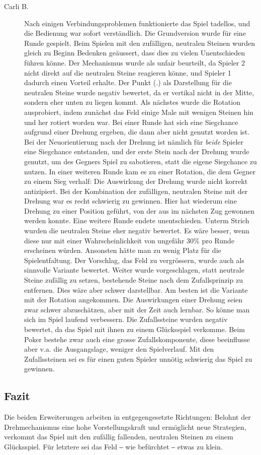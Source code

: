 \documentclass[a4paper,11pt,hidelinks]{scrartcl}
\begin{document}
\begin{description}
    \item[Carli B.] Nach einigen Verbindungsproblemen funktionierte das Spiel tadellos, und die Bedienung war sofort verständlich. Die Grundversion wurde für eine Runde gespielt. Beim Spielen mit den zufälligen, neutralen Steinen wurden gleich zu Beginn Bedenken geäussert, dass dies zu vielen Unentschieden führen könne. Der Mechanismus wurde als unfair beurteilt, da Spieler 2 nicht direkt auf die neutralen Steine reagieren könne, und Spieler 1 dadurch einen Vorteil erhalte. Der Punkt (.) als Darstellung für die neutralen Steine wurde negativ bewertet, da er vertikal nicht in der Mitte, sondern eher unten zu liegen kommt. Als nächstes wurde die Rotation ausprobiert, indem zunächst das Feld einige Male mit wenigen Steinen hin und her rotiert worden war. Bei einer Runde hat sich eine Siegchance aufgrund einer Drehung ergeben, die dann aber nicht genutzt worden ist. Bei der Neuorientierung nach der Drehung ist nämlich für \textit{beide} Spieler eine Siegchance entstanden, und der erste Stein nach der Drehung wurde genutzt, um des Gegners Spiel zu sabotieren, statt die eigene Siegchance zu nutzen. In einer weiteren Runde kam es zu einer Rotation, die dem Gegner zu einem Sieg verhalf: Die Auswirkung der Drehung wurde nicht korrekt antizipiert. Bei der Kombination der zufälligen, neutralen Steine mit der Drehung war es recht schwierig zu gewinnen. Hier hat wiederum eine Drehung zu einer Position geführt, von der aus im nächsten Zug gewonnen werden konnte. Eine weitere Runde endete unentschieden. Unterm Strich wurden die neutralen Steine eher negativ bewertet. Es wäre besser, wenn diese nur mit einer Wahrscheinlichkeit von ungefähr 30\% pro Runde erscheinen würden. Ansonsten hätte man zu wenig Platz für die Spielentfaltung. Der Vorschlag, das Feld zu vergrössern, wurde auch als sinnvolle Variante bewertet. Weiter wurde vorgeschlagen, statt neutrale Steine zufällig zu setzen, bestehende Steine nach dem Zufallsprinzip zu entfernen. Dies wäre aber schwer darstellbar. Am besten ist die Variante mit der Rotation angekommen. Die Auswirkungen einer Drehung seien zwar schwer abzuschätzen, aber mit der Zeit auch lernbar. So könne man sich im Spiel laufend verbessern. Die Zufallssteine wurden negativ bewertet, da das Spiel mit ihnen zu einem Glücksspiel verkomme. Beim Poker bestehe zwar auch eine grosse Zufallskomponente, diese beeinflusse aber v.a. die Ausgangslage, weniger den Spielverlauf. Mit den Zufallssteinen sei es für einen guten Spieler unnötig schwierig das Spiel zu gewinnen.
\end{description}

\subsection{Fazit}

Die beiden Erweiterungen arbeiten in entgegengesetzte Richtungen: Belohnt der Drehmechanismus eine hohe Vorstellungskraft und ermöglicht neue Strategien, verkommt das Spiel mit den zufällig fallenden, neutralen Steinen zu einem Glücksspiel. Für letztere sei das Feld ‒ wie befürchtet ‒ etwas zu klein.

\newpage

\listoffigures
{}
\end{document}
